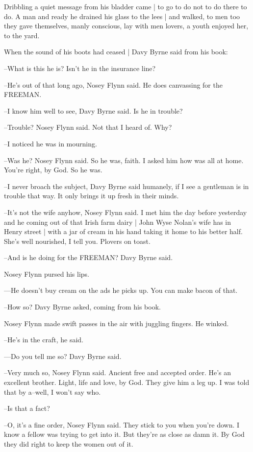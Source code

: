 Dribbling a quiet message from his bladder came |
to go to do not to do there to do.
A man and ready he drained his glass to the lees |
and walked,
to men too they gave themselves,
manly conscious,
lay with men lovers,
a youth enjoyed her,
to the yard.

When the sound of his boots had ceased |
Davy Byrne said from his book:

--What is this he is?
Isn't he in the insurance line?

--He's out of that long ago,
Nosey Flynn said.
He does canvassing for the FREEMAN.

--I know him well to see,
Davy Byrne said.
Is he in trouble?

--Trouble?
Nosey Flynn said.
Not that I heard of.
Why?

--I noticed he was in mourning.

--Was he?
Nosey Flynn said.
So he was, faith.
I asked him how was all at home.
You're right, by God.
So he was.

--I never broach the subject,
Davy Byrne said humanely,
if I see a gentleman is in trouble that way.
It only brings it up fresh in their minds.

--It's not the wife anyhow,
Nosey Flynn said.
I met him the day before yesterday
and he coming out of that Irish farm dairy |
John Wyse Nolan's wife has in Henry street |
with a jar of cream in his hand taking it home to his better half.
She's well nourished, I tell you.
Plovers on toast.

--And is he doing for the FREEMAN?
Davy Byrne said.

Nosey Flynn pursed his lips.

---He doesn't buy cream on the ads he picks up.
You can make bacon of that.

--How so?
Davy Byrne asked,
coming from his book.

Nosey Flynn made swift passes in the air with juggling fingers.
He winked.

--He's in the craft,
he said.

---Do you tell me so?
Davy Byrne said.

--Very much so,
Nosey Flynn said.
Ancient free and accepted order.
He's an excellent brother.
Light, life and love, by God.
They give him a leg up.
I was told that by a--well,
I won't say who.

--Is that a fact?

--O, it's a fine order,
Nosey Flynn said.
They stick to you when you're down.
I know a fellow was trying to get into it.
But they're as close as damn it.
By God they did right to keep the women out of it.

